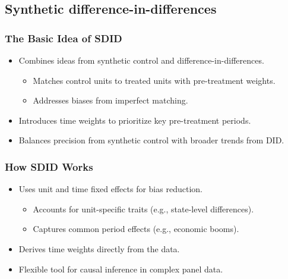 \documentclass{beamer}
\begin{document}
\subsection{Synthetic difference-in-differences}

\begin{frame}
\frametitle{The Basic Idea of SDID}

\begin{itemize}
    \item Combines ideas from synthetic control and difference-in-differences.
        \begin{itemize}
            \item Matches control units to treated units with pre-treatment weights.
            \item Addresses biases from imperfect matching.
        \end{itemize}
    \item Introduces time weights to prioritize key pre-treatment periods.
    \item Balances precision from synthetic control with broader trends from DID.
\end{itemize}

\end{frame}

\begin{frame}
\frametitle{How SDID Works}

\begin{itemize}
    \item Uses unit and time fixed effects for bias reduction.
        \begin{itemize}
            \item Accounts for unit-specific traits (e.g., state-level differences).
            \item Captures common period effects (e.g., economic booms).
        \end{itemize}
    \item Derives time weights directly from the data.
    \item Flexible tool for causal inference in complex panel data.
\end{itemize}

\end{frame}
\end{document}
